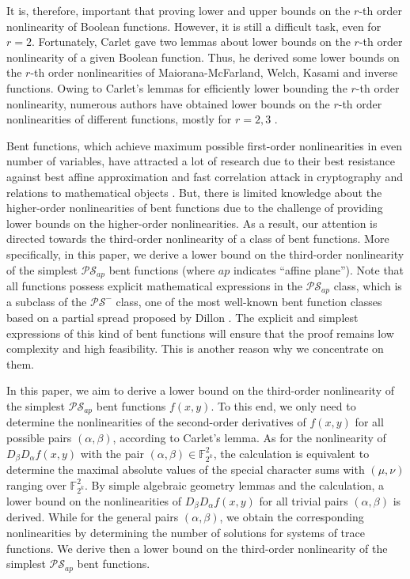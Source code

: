 \documentclass{article}
\newcommand{\F}{\mathbb{F}}
\newcommand{\0}{\textbf{0}}
\newcommand{\1}{\textbf{1}}
\theoremstyle{plain}
\begin{document}
    It is, therefore, important that proving lower and upper bounds on the $r$-th order nonlinearity of Boolean functions.
    However, it is still a difficult task, even for $r=2$. 
    Fortunately, Carlet \cite{Carlet2008lowbound_NL_profile} gave two lemmas about lower bounds on the $r$-th order nonlinearity of a given Boolean function.
    Thus, he derived some lower bounds on the $r$-th order nonlinearities of Maiorana-McFarland, Welch, Kasami and inverse functions.
    Owing to Carlet's lemmas for efficiently lower bounding the $r$-th order nonlinearity, numerous authors have obtained lower bounds on the $r$-th order nonlinearities of different functions, mostly for $r=2,3$ \cite{YanT2020NL_2,Liu2023NL_2,TangYZZ2020NL_2bent,SihemKJ2020NL_2cubic,SunW2009NL_2,SarkarG2009NL_2MM,GangopadhyayST2010NL_2,GodeG2010NL_3Kasami,SunW2011NL_2,TangCT2013NL_2bent,Singh2014NL_3_biquadratic,GaoT2017NL_2_MM}.

    Bent functions, which achieve maximum possible first-order nonlinearities in even number of variables,
    have attracted a lot of research due to their best resistance against best affine approximation and fast correlation attack in cryptography and relations to mathematical objects \cite{Carlet2020book}.
    But, there is limited knowledge about the higher-order nonlinearities of bent functions due to the challenge of providing lower bounds on the higher-order nonlinearities. 
    As a result, our attention is directed towards the third-order nonlinearity of a class of bent functions.
    More specifically, in this paper, we derive a lower bound on the third-order nonlinearity of the simplest $\mathcal{PS}_{ap}$ bent functions (where $ap$ indicates ``affine plane'').
    Note that all functions possess explicit mathematical expressions in the $\mathcal{PS}_{ap}$ class, which is a subclass of the $\mathcal{PS}^-$ class, one of the most well-known bent function classes based on a partial spread proposed by Dillon \cite{Dillon1974PSbent}.
    The explicit and simplest expressions of this kind of bent functions will ensure that the proof remains  low complexity and high feasibility. This is another reason why we concentrate on them.

    In this paper, we aim to derive a lower bound on the third-order nonlinearity of the simplest $\mathcal{PS}_{ap}$ bent functions $f(x,y)$.
    To this end, we only need to determine the nonlinearities of the second-order derivatives of $f(x,y)$ for all possible pairs $(\alpha,\beta)$, according to Carlet's lemma.
    As for the nonlinearity of $D_{\beta}D_{\alpha}f(x,y)$ with the pair $(\alpha,\beta)\in\F_{2^k}^2$, the calculation is equivalent to determine the maximal absolute values of the special character sums with $(\mu,\nu)$ ranging over $\F_{2^k}^2$.
    By simple algebraic geometry lemmas and the calculation, a lower bound on the nonlinearities of $D_{\beta}D_{\alpha}f(x,y)$ for all trivial pairs $(\alpha,\beta)$ is derived.
    While for the general pairs $(\alpha,\beta)$, we obtain the corresponding nonlinearities by determining the number of solutions for systems of trace functions.
    We derive then a lower bound on the third-order nonlinearity of the simplest $\mathcal{PS}_{ap}$ bent functions.
\end{document}
